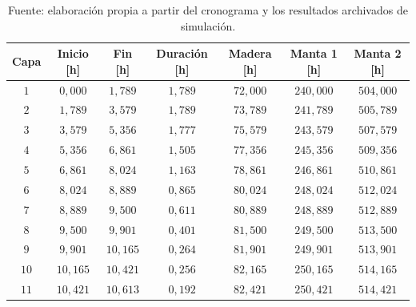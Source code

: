 \begin{table}[H]
  \centering
  \caption{Cronograma por capa del plan de $60\,\mathrm{m^3/h}$}
  \label{tab:cronograma-60}
  \small
  \setlength{\tabcolsep}{4pt}
  \begin{tabular}{ccccccc}
    \toprule
    Capa & Inicio [h] & Fin [h] & Duración [h] & Madera [h] & Manta 1 [h] & Manta 2 [h] \\
    \midrule
    $1$ & $0{,}000$ & $1{,}789$ & $1{,}789$ & $72{,}000$ & $240{,}000$ & $504{,}000$ \\
    $2$ & $1{,}789$ & $3{,}579$ & $1{,}789$ & $73{,}789$ & $241{,}789$ & $505{,}789$ \\
    $3$ & $3{,}579$ & $5{,}356$ & $1{,}777$ & $75{,}579$ & $243{,}579$ & $507{,}579$ \\
    $4$ & $5{,}356$ & $6{,}861$ & $1{,}505$ & $77{,}356$ & $245{,}356$ & $509{,}356$ \\
    $5$ & $6{,}861$ & $8{,}024$ & $1{,}163$ & $78{,}861$ & $246{,}861$ & $510{,}861$ \\
    $6$ & $8{,}024$ & $8{,}889$ & $0{,}865$ & $80{,}024$ & $248{,}024$ & $512{,}024$ \\
    $7$ & $8{,}889$ & $9{,}500$ & $0{,}611$ & $80{,}889$ & $248{,}889$ & $512{,}889$ \\
    $8$ & $9{,}500$ & $9{,}901$ & $0{,}401$ & $81{,}500$ & $249{,}500$ & $513{,}500$ \\
    $9$ & $9{,}901$ & $10{,}165$ & $0{,}264$ & $81{,}901$ & $249{,}901$ & $513{,}901$ \\
    $10$ & $10{,}165$ & $10{,}421$ & $0{,}256$ & $82{,}165$ & $250{,}165$ & $514{,}165$ \\
    $11$ & $10{,}421$ & $10{,}613$ & $0{,}192$ & $82{,}421$ & $250{,}421$ & $514{,}421$ \\
    \bottomrule
  \end{tabular}
  \captionsetup{skip=2pt}
  \caption*{Fuente: elaboración propia a partir del cronograma y los resultados archivados de simulación.}
\end{table}
